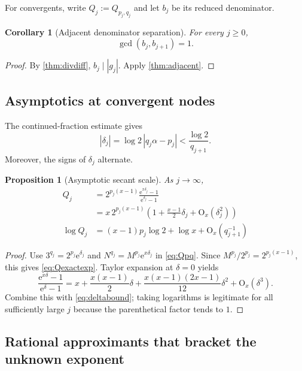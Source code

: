 \documentclass[11pt,oneside]{article}
\newtheorem{proposition}[theorem]{Proposition}
\newtheorem{corollary}[theorem]{Corollary}
\theoremstyle{definition}
\theoremstyle{remark}
\newcommand{\abs}[1]{\left|#1\right|}
\newcommand{\e}{\mathrm e}
\newcommand{\bigO}{\mathrm O}
\begin{document}
For convergents, write $Q_j:=Q_{p_j,q_j}$ and let $b_j$ be its reduced
denominator.

\begin{corollary}[Adjacent denominator separation]
\label{cor:denomsep}
For every $j\ge0$,
\[
  \gcd(b_j,b_{j+1})=1.
\]
\end{corollary}

\begin{proof}
By \cref{thm:divdiff}, $b_j\mid\abs{g_j}$.  Apply
\cref{thm:adjacent}.
\end{proof}

\subsection{Asymptotics at convergent nodes}

The continued-fraction estimate gives
\begin{equation}
  \abs{\delta_j}
  =\log2\,\abs{q_j\alpha-p_j}
  <\frac{\log2}{q_{j+1}}.
  \label{eq:deltabound}
\end{equation}
Moreover, the signs of $\delta_j$ alternate.

\begin{proposition}[Asymptotic secant scale]
\label{prop:Qasymp}
As $j\to\infty$,
\begin{align}
 Q_j
 &=2^{p_j(x-1)}\frac{\e^{x\delta_j}-1}{\e^{\delta_j}-1}
 \label{eq:Qexactexp}\\
 &=x\,2^{p_j(x-1)}
 \left(1+\frac{x-1}{2}\delta_j+\bigO_x(\delta_j^2)\right)
 \label{eq:Qasymp}\\
 \log Q_j
 &=(x-1)p_j\log2+\log x+\bigO_x(q_{j+1}^{-1})
 \label{eq:logQ}
\end{align}
\end{proposition}

\begin{proof}
Use $3^{q_j}=2^{p_j}\e^{\delta_j}$ and
$N^{q_j}=M^{p_j}\e^{x\delta_j}$ in \eqref{eq:Qpq}.  Since
$M^{p_j}/2^{p_j}=2^{p_j(x-1)}$, this gives \eqref{eq:Qexactexp}.  Taylor
expansion at $\delta=0$ yields
\[
 \frac{\e^{x\delta}-1}{\e^\delta-1}
 =x+\frac{x(x-1)}2\delta
 +\frac{x(x-1)(2x-1)}{12}\delta^2+\bigO_x(\delta^3).
\]
Combine this with \eqref{eq:deltabound}; taking logarithms is legitimate for
all sufficiently large $j$ because the parenthetical factor tends to $1$.
\end{proof}

\subsection{Rational approximants that bracket the unknown exponent}
\end{document}
